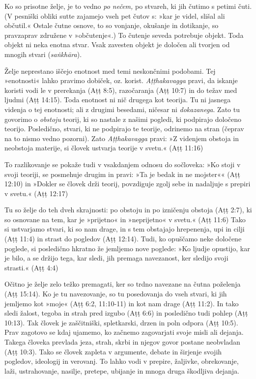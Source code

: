 Ko so
prisotne želje, je to vedno \emph{po nečem,} po stvareh, ki jih čutimo s
petimi čuti. (V pesniški obliki sutte zajamejo vseh pet čutov s: »kar je
videl, slišal ali občutil.« Ostale čutne osnove, to so vonjanje,
okušanje in dotikanje, so pravzaprav združene v »občutenje«.) To čutenje
seveda potrebuje objekt. Toda objekt ni neka enotna stvar. Vsak zavesten
objekt je določen ali tvorjen od mnogih stvari (\emph{saṅkhāra}). 

Želje
neprestano iščejo enotnost med temi neskončnimi podobami. Tej
»enotnosti« lahko pravimo dobiček, oz. korist. \emph{Aṭṭhakavagga}
pravi, da iskanje koristi vodi le v prerekanja (Aṭṭ 8:5), razočaranja
(Aṭṭ 10:7) in do težav med ljudmi (Aṭṭ 14:15). Toda enotnost ni nič
drugega kot teorija. Tu ni jasnega videnja o tej enotnosti; ali z
drugimi besedami, ničesar ni \emph{dokazanega}. Zato tu govorimo o
\emph{obstoju} teorij, ki so nastale z našimi pogledi, ki podpirajo
določeno teorijo. Posledično, stvari, ki ne podpirajo te teorije,
odrinemo na stran (čeprav na to nismo vedno pozorni). Zato
\emph{Aṭṭhakavagga} pravi: »Z videnjem obstoja in neobstoja materije, si
človek ustvarja teorije v svetu.« (Aṭṭ 11:16) 

To razlikovanje se pokaže
tudi v vsakdanjem odnosu do sočloveka: »Ko stoji v svoji teoriji, se
posmehuje drugim in pravi: »Ta je bedak in ne mojster«« (Aṭṭ 12:10) in
»Dokler se človek drži teorij, povzdiguje zgolj sebe in nadaljuje s
prepiri v svetu.« (Aṭṭ 12:17) 

Tu so želje do teh dveh skrajnosti: po
obstoju in po izničenju obstoja (Aṭṭ 2:7), ki so osnovane na tem, kar je
»prijetno« in »neprijetno« v svetu.« (Aṭṭ 11:6) Tako si ustvarjamo
stvari, ki so nam drage, in s tem obstajajo hrepenenja, upi in cilji
(Aṭṭ 11:4) in strast do pogledov (Aṭṭ 12:14). Tudi, ko opuščamo neke
določene poglede, si posledično hkratno že jemljemo nove poglede: »Ko
ljudje opustijo, kar je bilo, a se držijo tega, kar sledi, jih premaga
navezanost, ker sledijo svoji strasti.« (Aṭṭ 4:4) 

Očitno je želje zelo
težko premagati, ker so trdno navezane na čutna poželenja (Aṭṭ 15:14).
Ko je tu navezovanje, so tu posedovanja do vseh stvari, ki jih jemljemo
kot »moje« (Aṭṭ 6:2, 11:10-11) in kot nam drage (Aṭṭ 11:2). In tako
sledi žalost, tegoba in strah pred izgubo (Aṭṭ 6:6) in posledično tudi
pohlep (Aṭṭ 10:13). Tak človek je zaščitniški, spletkarski, drzen in
poln odpora (Aṭṭ 10:5). Prav zagotovo se kdaj ujamemo, ko začnemo
zagovarjati svoje misli ali dejanja. Takega človeka prevlada jeza,
strah, skrbi in njegov govor postane neobvladan (Aṭṭ 10:3). Tako se
človek zapleta v argumente, debate in širjenje svojih pogledov,
ideologij in verovanj. To lahko vodi v prepire, žaljivke, obrekovanje,
laži, ustrahovanje, nasilje, pretepe, ubijanje in mnoga druga škodljiva
dejanja.

